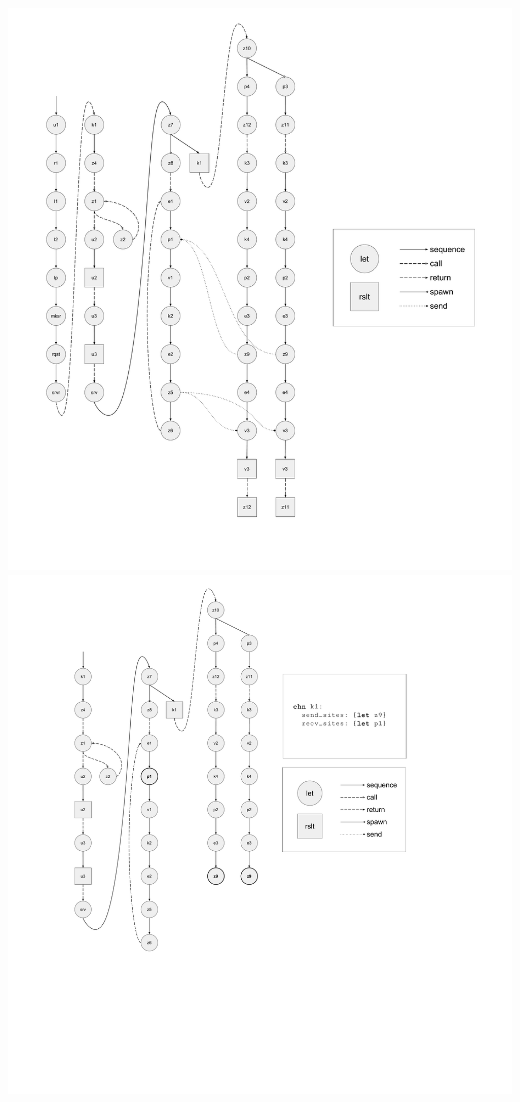 \documentclass[10pt]{article}
\begin{document}
\includegraphics[width=1.3\textwidth, left]{cml_graph_lp.pdf}
\includegraphics[width=1.3\textwidth, left]{cml_graph_k1.pdf}
\end{document}

